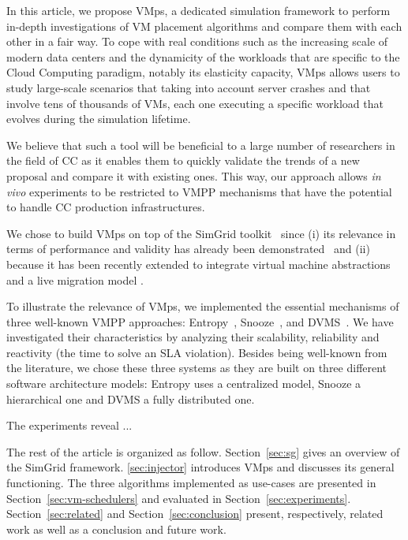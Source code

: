 \documentclass[conference]{IEEEtran}
\newcommand{\sg}{SimGrid\xspace}
\newcommand{\vmps}{VMps\xspace}
\begin{document}
In this article, we propose %
\vmps, a dedicated simulation framework to perform in-depth
investigations of VM placement algorithms and compare them with each
other in a fair way. To cope with real conditions such as the
increasing scale of modern data centers and the dynamicity of the
workloads that are specific to the Cloud Computing paradigm, notably
its elasticity capacity, \vmps allows users to study large-scale
scenarios that taking into account server crashes and that involve
tens of thousands of VMs, each one executing a specific workload that
evolves during the simulation lifetime.

We believe that such a tool will be beneficial to a large number of
researchers in the field of CC as it enables them to quickly validate
the trends of a new proposal and compare it with existing
ones. This way, our approach allows \textit{in vivo} experiments to be
restricted to VMPP mechanisms that have the potential to handle CC
production infrastructures.

%
We chose to build \vmps on top of the \sg
toolkit~\cite{casanova:hal-01017319} since (i) its relevance in terms
of performance and validity has already been
demonstrated~\cite{simgridpub} and (ii) because it has been recently
extended to integrate virtual machine abstractions and a live
migration model \cite{Hirofuchi:2013:ALM:2568486.2568524}.

To illustrate the relevance of \vmps, we implemented the essential
mechanisms of three well-known VMPP approaches:
Entropy~\cite{Hermenier:2009:ECM:1508293.1508300},
Snooze~\cite{feller:ccgrid12}, and DVMS~\cite{quesnel:cpe2012}. We
have investigated their characteristics by analyzing their
scalability, reliability and reactivity (\ie the time to solve an SLA
violation). Besides being well-known from the literature, we chose
these three systems as they are built on three different software
architecture models: Entropy uses a centralized model, Snooze a
hierarchical one and DVMS a fully distributed one.

The experiments reveal ...

The rest of the article is organized as follow. Section~\ref{sec:sg}
gives an overview of the \sg framework.  \ref{sec:injector} introduces
\vmps and discusses its general functioning.  The three algorithms
implemented as use-cases are presented in
Section~\ref{sec:vm-schedulers} and evaluated in
Section~\ref{sec:experiments}.  Section~\ref{sec:related} and
Section~\ref{sec:conclusion} present, respectively, related work as
well as a conclusion and future work.
\end{document}
